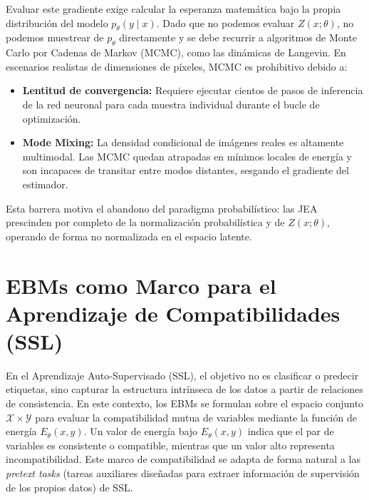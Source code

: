 Evaluar este gradiente exige calcular la esperanza matemática bajo la propia distribución del modelo $p_\theta(y \mid x)$. Dado que no podemos evaluar $Z(x; \theta)$, no podemos muestrear de $p_\theta$ directamente y se debe recurrir a algoritmos de Monte Carlo por Cadenas de Markov (MCMC), como las dinámicas de Langevin. En escenarios realistas de dimensiones de píxeles, MCMC es prohibitivo debido a:
\begin{itemize}
    \item \textbf{Lentitud de convergencia:} Requiere ejecutar cientos de pasos de inferencia de la red neuronal para cada muestra individual durante el bucle de optimización.
    \item \textbf{Mode Mixing:} La densidad condicional de imágenes reales es altamente multimodal. Las MCMC quedan atrapadas en mínimos locales de energía y son incapaces de transitar entre modos distantes, sesgando el gradiente del estimador.
\end{itemize}

Esta barrera  motiva el abandono del paradigma probabilístico: las JEA prescinden por completo de la normalización probabilística y de $Z(x; \theta)$, operando de forma no normalizada en el espacio latente.




\section{EBMs como Marco para el Aprendizaje de Compatibilidades (SSL)}
\label{sec:ebm_ssl}

En el Aprendizaje Auto-Supervisado (SSL), el objetivo no es clasificar o predecir etiquetas, sino capturar la estructura intrínseca de los datos a partir de relaciones de consistencia. En este contexto, los EBMs se formulan sobre el espacio conjunto $\mathcal{X} \times \mathcal{Y}$ para evaluar la compatibilidad mutua de variables mediante la función de energía $E_\theta(x, y)$. Un valor de energía bajo $E_\theta(x, y)$ indica que el par de variables es consistente o compatible, mientras que un valor alto representa incompatibilidad. Este marco de compatibilidad se adapta de forma natural a las \textit{pretext tasks} (tareas auxiliares diseñadas para extraer información de supervisión de los propios datos) de SSL.

